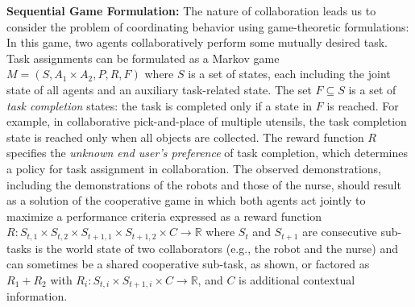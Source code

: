 \documentclass[letterpaper, 11 pt, onecolumn]{article}
\begin{document}
\noindent
{\bf Sequential Game Formulation:} 
The nature of collaboration leads us to consider the problem of coordinating behavior using game-theoretic formulations: In this game, two agents collaboratively perform some mutually desired task. 
Task assignments can be formulated as a Markov game $M=(S, A_1\times
A_2, P, R, F)$ where $S$ is a set of states, each including the joint
state of all agents and an auxiliary task-related
state. The set $F\subseteq S$ is a set of \emph{task completion}
states: the task is completed only if a state in $F$ is reached. For
example, in collaborative pick-and-place of multiple utensils,
the task completion state is reached only when all objects are
collected. The reward function $R$ specifies the \emph{unknown
end user's preference} of task completion, which determines a
policy for task assignment in collaboration. 
The observed demonstrations, including the demonstrations of the robots and those of the nurse, should result as a solution of the cooperative game in which both agents act jointly to maximize a performance criteria expressed as a reward function $R: S_{t,1} \times S_{t,2} \times S_{t+1,1}\times S_{t+1,2} \times C \rightarrow \mathbb{R}$ where $S_t$ and $S_{t+1}$ are consecutive sub-tasks is the world state of two collaborators (e.g., the robot and the nurse) and can sometimes be a shared cooperative sub-task, as shown, or factored as $R_1 + R_2$ with $R_i: S_{t,i} \times S_{t+1,i} \times C \rightarrow \mathbb{R}$, and $C$ is additional contextual information.
\end{document}
